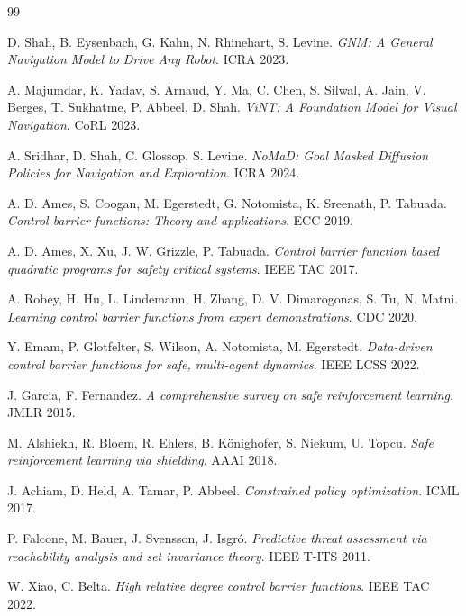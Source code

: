 \documentclass[letterpaper]{article}
\begin{document}
\begin{thebibliography}{99}

D. Shah, B. Eysenbach, G. Kahn, N. Rhinehart, S. Levine.
\textit{GNM: A General Navigation Model to Drive Any Robot}.
ICRA 2023.

A. Majumdar, K. Yadav, S. Arnaud, Y. Ma, C. Chen, S. Silwal,
A. Jain, V. Berges, T. Sukhatme, P. Abbeel, D. Shah.
\textit{ViNT: A Foundation Model for Visual Navigation}.
CoRL 2023.

A. Sridhar, D. Shah, C. Glossop, S. Levine.
\textit{NoMaD: Goal Masked Diffusion Policies for Navigation and Exploration}.
ICRA 2024.

A. D. Ames, S. Coogan, M. Egerstedt, G. Notomista, K. Sreenath, P. Tabuada.
\textit{Control barrier functions: Theory and applications}.
ECC 2019.

A. D. Ames, X. Xu, J. W. Grizzle, P. Tabuada.
\textit{Control barrier function based quadratic programs for safety critical systems}.
IEEE TAC 2017.

A. Robey, H. Hu, L. Lindemann, H. Zhang, D. V. Dimarogonas, S. Tu, N. Matni.
\textit{Learning control barrier functions from expert demonstrations}.
CDC 2020.

Y. Emam, P. Glotfelter, S. Wilson, A. Notomista, M. Egerstedt.
\textit{Data-driven control barrier functions for safe, multi-agent dynamics}.
IEEE LCSS 2022.

J. Garcia, F. Fernandez.
\textit{A comprehensive survey on safe reinforcement learning}.
JMLR 2015.

M. Alshiekh, R. Bloem, R. Ehlers, B. K\"onighofer, S. Niekum, U. Topcu.
\textit{Safe reinforcement learning via shielding}.
AAAI 2018.

J. Achiam, D. Held, A. Tamar, P. Abbeel.
\textit{Constrained policy optimization}.
ICML 2017.

P. Falcone, M. Bauer, J. Svensson, J. Isgr\'o.
\textit{Predictive threat assessment via reachability analysis and set invariance theory}.
IEEE T-ITS 2011.

W. Xiao, C. Belta.
\textit{High relative degree control barrier functions}.
IEEE TAC 2022.


\end{thebibliography}
\end{document}
